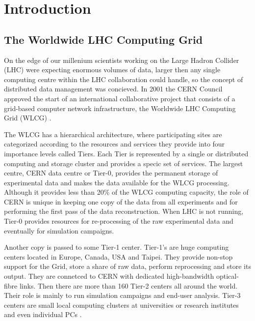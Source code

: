 \chapter*{Introduction}

\section*{The Worldwide LHC Computing Grid}
On the edge of our millenium scientists working on the Large Hadron Collider (LHC) were expecting enormous volumes 
of data, larger then any single computing centre within the LHC collaboration could handle, so the concept of 
distributed data management was concieved. In 2001 the CERN Council approved the start of an international 
collaborative project that consists of a grid-based computer network infrastructure, the Worldwide LHC Computing 
Grid (WLCG) \cite{happyBday}. 

The WLCG has a hierarchical architecture, where participating sites are categorized according to the resources and 
services they provide into four importance levels called Tiers. Each Tier is represented by a single or distributed 
computing and storage cluster and provides a specic set of services. The largest centre, CERN data centre or Tier-0, 
provides the  permanent storage of experimental data and makes the data available for the WLCG processing. Although 
it provides less than 20\% of the WLCG computing capacity, the role of CERN is unique in keeping one copy of the 
data from all experiments and for performing the first pass of the data reconstruction. When LHC is not running, 
Tier-0 provides resources for re-processing of the raw experimental data and eventually for simulation campaigns. 

Another copy is passed to some Tier-1 
center. Tier-1's are huge computing centers located in Europe, Canada, USA and Taipei. They provide non-stop support 
for the Grid, store a share of raw data, perform reprocessing and store its output. They are connetced to CERN with 
dedicated high-bandwidth optical-fibre links. Then there are more than 160 Tier-2 centers all around the world. 
Their role is mainly to run simulation campaigns and end-user analysis. Tier-3 centers are small local computing 
clusters at universities or research institutes and even individual PCs \cite{TGrid}.


